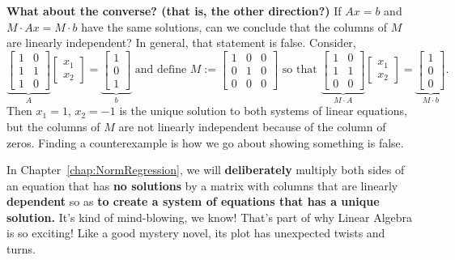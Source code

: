 \textbf{What about the converse? (that is, the other direction?) } If $Ax=b$ and $M \cdot A x = M \cdot b$ have the same solutions, can we conclude that the columns of $M$ are linearly independent? In general, that statement is false. Consider, 
$$\underbrace{\left[
\begin{array}{cc}
1 & 0 \\
1 & 1\\
1 & 0 
\end{array}
\right] }_{A}  \begin{bmatrix}
    x_1 \\x_2
\end{bmatrix} =\underbrace{\begin{bmatrix}
    1\\0 \\1
\end{bmatrix} }_{b} \text{ and define } M := \left[
\begin{array}{ccc}
1 & 0 & 0\\
0 & 1 & 0\\
0 & 0  & 0
\end{array}
\right] \text{ so that } \underbrace{\left[ \begin{array}{cc}
1 & 0 \\
1 & 1\\
0 & 0 
\end{array}
\right] }_{M \cdot A}  \begin{bmatrix}
    x_1 \\x_2
\end{bmatrix} =\underbrace{ \begin{bmatrix}
    1\\0 \\0
\end{bmatrix} }_{M \cdot b}.$$
Then $x_1 = 1$, $x_2=-1$ is the unique solution to both systems of linear equations, but the columns of $M$ are not linearly independent because of the column of zeros. Finding a counterexample is how we go about showing something is false. 

\begin{remark} In Chapter~\ref{chap:NormRegression}, we will \textbf{deliberately} multiply both sides of an equation that has \textbf{no solutions} by a matrix with columns that are linearly \textbf{dependent} so as \textbf{to create a system of equations that has a unique solution.} It's kind of mind-blowing, we know! That's part of why Linear Algebra is so exciting! Like a good mystery novel, its plot has unexpected twists and turns. 
\end{remark}


